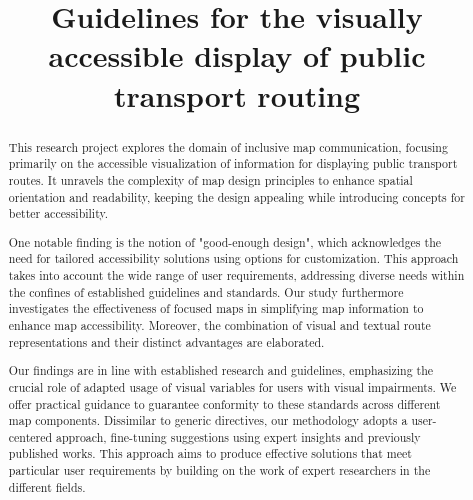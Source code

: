 \documentclass[agile, final]{copernicus-agile}
\begin{document}
\title{Guidelines for the visually accessible display of public transport routing}





\maketitle


\begin{abstract}

This research project explores the domain of inclusive map communication, focusing primarily on the accessible visualization of information for displaying public transport routes. It unravels the complexity of map design principles to enhance spatial orientation and readability, keeping the design appealing while introducing concepts for better accessibility.

One notable finding is the notion of "good-enough design", which acknowledges the need for tailored accessibility solutions using options for customization. This approach takes into account the wide range of user requirements, addressing diverse needs within the confines of established guidelines and standards. Our study furthermore investigates the effectiveness of focused maps in simplifying map information to enhance map accessibility. Moreover, the combination of visual and textual route representations and their distinct advantages are elaborated.

Our findings are in line with established research and guidelines, emphasizing the crucial role of adapted usage of visual variables for users with visual impairments. We offer practical guidance to guarantee conformity to these standards across different map components. Dissimilar to generic directives, our methodology adopts a user-centered approach, fine-tuning suggestions using expert insights and previously published works. This approach aims to produce effective solutions that meet particular user requirements by building on the work of expert researchers in the different fields.


\end{abstract}
\end{document}
